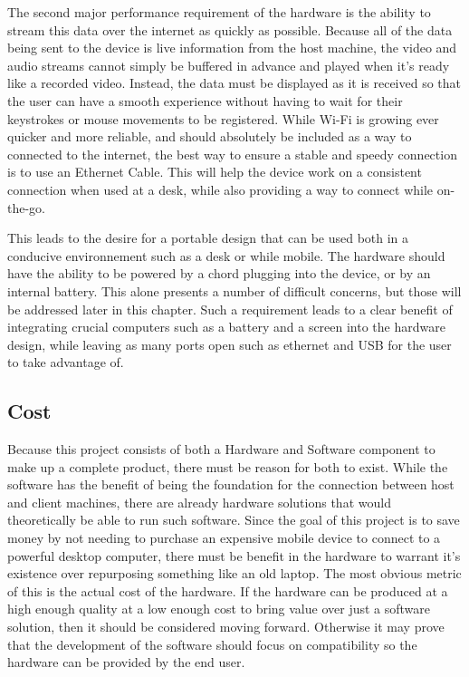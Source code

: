 The second major performance requirement of the hardware is the ability to stream this data over the internet as quickly as possible.
Because all of the data being sent to the device is live information from the host machine, the video and audio streams cannot simply be buffered in advance and played when it's ready like a recorded video.
Instead, the data must be displayed as it is received so that the user can have a smooth experience without having to wait for their keystrokes or mouse movements to be registered.
While Wi-Fi is growing ever quicker and more reliable, and should absolutely be included as a way to connected to the internet, the best way to ensure a stable and speedy connection is to use an Ethernet Cable.
This will help the device work on a consistent connection when used at a desk, while also providing a way to connect while on-the-go.

This leads to the desire for a portable design that can be used both in a conducive environnement such as a desk or while mobile.
The hardware should have the ability to be powered by a chord plugging into the device, or by an internal battery.
This alone presents a number of difficult concerns, but those will be addressed later in this chapter.
Such a requirement leads to a clear benefit of integrating crucial computers such as a battery and a screen into the hardware design, while leaving as many ports open such as ethernet and USB for the user to take advantage of.


\subsection{Cost}\label{sec:HardwareCost}

Because this project consists of both a Hardware and Software component to make up a complete product, there must be reason for both to exist.
While the software has the benefit of being the foundation for the connection between host and client machines, there are already hardware solutions that would theoretically be able to run such software.
Since the goal of this project is to save money by not needing to purchase an expensive mobile device to connect to a powerful desktop computer, there must be benefit in the hardware to warrant it's existence over repurposing something like an old laptop.
The most obvious metric of this is the actual cost of the hardware.
If the hardware can be produced at a high enough quality at a low enough cost to bring value over just a software solution, then it should be considered moving forward.
Otherwise it may prove that the development of the software should focus on compatibility so the hardware can be provided by the end user.


